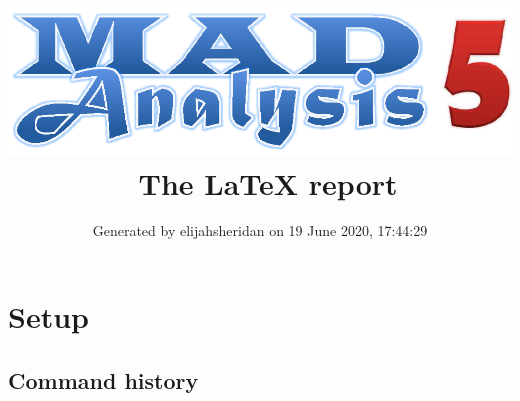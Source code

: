 \documentclass[a4paper, 10pt]{article}
\title{{\includegraphics[scale=.4]{logo.eps}}\ The LaTeX report}
\author{Generated by elijahsheridan on 19 June 2020, 17:44:29}
\begin{document}
\maketitle
\flushbottom

\newpage
\section{ Setup}

\subsection{ Command history}
\end{document}
